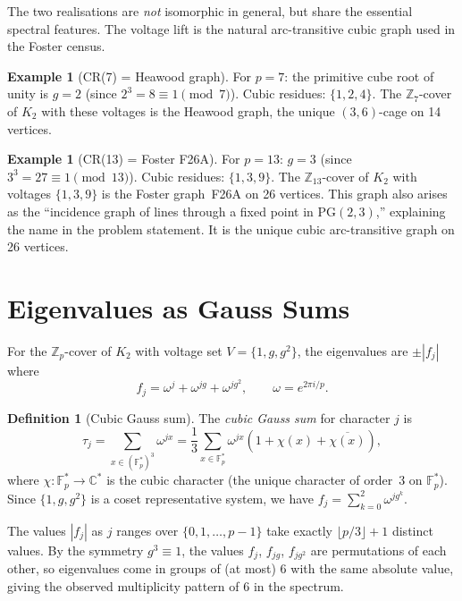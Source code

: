 \documentclass[11pt,a4paper]{article}
\theoremstyle{plain}
\theoremstyle{definition}
\newtheorem{definition}[theorem]{Definition}
\newtheorem{example}[theorem]{Example}
\theoremstyle{remark}
\newcommand{\Z}{\mathbb{Z}}
\newcommand{\C}{\mathbb{C}}
\newcommand{\F}{\mathbb{F}}
\begin{document}
The two realisations are \emph{not} isomorphic in general, but share the
essential spectral features. The voltage lift is the natural arc-transitive
cubic graph used in the Foster census.

\begin{example}[CR(7) = Heawood graph]
For $p = 7$: the primitive cube root of unity is $g = 2$ (since
$2^3 = 8 \equiv 1 \pmod{7}$). Cubic residues: $\{1, 2, 4\}$.
The $\Z_7$-cover of $K_2$ with these voltages is the Heawood graph,
the unique $(3,6)$-cage on 14 vertices.
\end{example}

\begin{example}[CR(13) = Foster F26A]
For $p = 13$: $g = 3$ (since $3^3 = 27 \equiv 1 \pmod{13}$). Cubic
residues: $\{1, 3, 9\}$. The $\Z_{13}$-cover of $K_2$ with voltages
$\{1, 3, 9\}$ is the Foster graph~F26A on 26 vertices. This graph also
arises as the ``incidence graph of lines through a fixed point in
$\mathrm{PG}(2,3)$,'' explaining the name in the problem statement.
It is the unique cubic arc-transitive graph on 26 vertices.
\end{example}


\section{Eigenvalues as Gauss Sums}
\label{sec:analytical}

For the $\Z_p$-cover of $K_2$ with voltage set $V = \{1, g, g^2\}$, the
eigenvalues are $\pm |f_j|$ where
\[
  f_j = \omega^j + \omega^{jg} + \omega^{jg^2}, \qquad \omega = e^{2\pi i/p}.
\]

\begin{definition}[Cubic Gauss sum]
The \emph{cubic Gauss sum} for character $j$ is
\[
  \tau_j = \sum_{x \in (\F_p^*)^3} \omega^{jx}
  = \frac{1}{3} \sum_{x \in \F_p^*} \omega^{jx}(1 + \chi(x) + \overline{\chi(x)}),
\]
where $\chi: \F_p^* \to \C^*$ is the cubic character (the unique character of
order~3 on $\F_p^*$). Since $\{1, g, g^2\}$ is a coset representative system,
we have $f_j = \sum_{k=0}^{2} \omega^{j g^k}$.
\end{definition}

The values $|f_j|$ as $j$ ranges over $\{0, 1, \ldots, p-1\}$ take exactly
$\lfloor p/3 \rfloor + 1$ distinct values. By the symmetry $g^3 \equiv 1$,
the values $f_j$, $f_{jg}$, $f_{jg^2}$ are permutations of each other,
so eigenvalues come in groups of (at most) 6 with the same absolute value,
giving the observed multiplicity pattern of $6$ in the spectrum.
\end{document}
